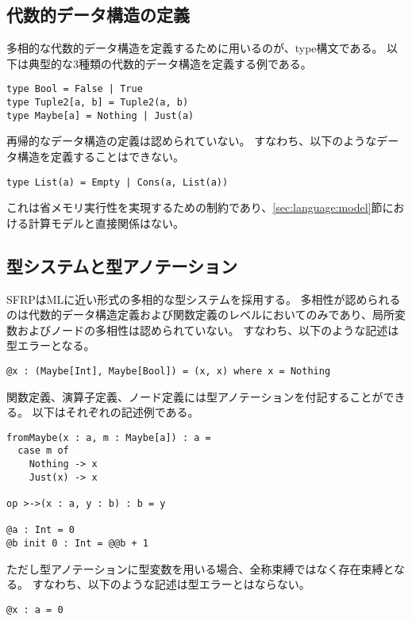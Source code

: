 \subsection{代数的データ構造の定義}
多相的な代数的データ構造を定義するために用いるのが、type構文である。
以下は典型的な3種類の代数的データ構造を定義する例である。
\begin{lstlisting}[basicstyle=\ttfamily\small,language=SFRP]
type Bool = False | True
type Tuple2[a, b] = Tuple2(a, b)
type Maybe[a] = Nothing | Just(a)
\end{lstlisting}
再帰的なデータ構造の定義は認められていない。
すなわち、以下のようなデータ構造を定義することはできない。
\begin{lstlisting}[basicstyle=\ttfamily\small,language=SFRP]
type List(a) = Empty | Cons(a, List(a))
\end{lstlisting}
これは省メモリ実行性を実現するための制約であり、\ref{sec:language:model}節における計算モデルと直接関係はない。

\subsection{型システムと型アノテーション}
SFRPはMLに近い形式の多相的な型システムを採用する。
多相性が認められるのは代数的データ構造定義および関数定義のレベルにおいてのみであり、局所変数およびノードの多相性は認められていない。
すなわち、以下のような記述は型エラーとなる。
\begin{lstlisting}[basicstyle=\ttfamily\small,language=SFRP]
@x : (Maybe[Int], Maybe[Bool]) = (x, x) where x = Nothing
\end{lstlisting}
関数定義、演算子定義、ノード定義には型アノテーションを付記することができる。
以下はそれぞれの記述例である。
\begin{lstlisting}[basicstyle=\ttfamily\small,language=SFRP]
fromMaybe(x : a, m : Maybe[a]) : a =
  case m of
    Nothing -> x
    Just(x) -> x

op >->(x : a, y : b) : b = y

@a : Int = 0
@b init 0 : Int = @@b + 1
\end{lstlisting}
ただし型アノテーションに型変数を用いる場合、全称束縛ではなく存在束縛となる。
すなわち、以下のような記述は型エラーとはならない。
\begin{lstlisting}[basicstyle=\ttfamily\small,language=SFRP]
@x : a = 0
\end{lstlisting}


